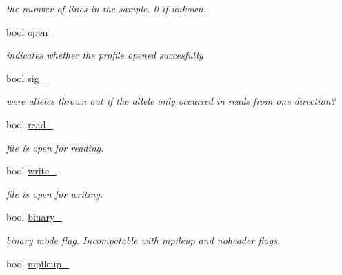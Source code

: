 \begin{DoxyCompactItemize}
\begin{DoxyCompactList}\small\item\em the number of lines in the sample. 0 if unkown. \end{DoxyCompactList}\item 
\hypertarget{classprofile_abf881480daa99f3fa69479b2d63db2c3}{bool \hyperlink{classprofile_abf881480daa99f3fa69479b2d63db2c3}{open\-\_\-}}\label{classprofile_abf881480daa99f3fa69479b2d63db2c3}

\begin{DoxyCompactList}\small\item\em indicates whether the profile opened succesfully \end{DoxyCompactList}\item 
\hypertarget{classprofile_a0ea932076e4991184cccc203c385c494}{bool \hyperlink{classprofile_a0ea932076e4991184cccc203c385c494}{sig\-\_\-}}\label{classprofile_a0ea932076e4991184cccc203c385c494}

\begin{DoxyCompactList}\small\item\em were alleles thrown out if the allele only occurred in reads from one direction? \end{DoxyCompactList}\item 
\hypertarget{classprofile_ab86c9f0e89a08b2441a9790c591f3bc4}{bool \hyperlink{classprofile_ab86c9f0e89a08b2441a9790c591f3bc4}{read\-\_\-}}\label{classprofile_ab86c9f0e89a08b2441a9790c591f3bc4}

\begin{DoxyCompactList}\small\item\em file is open for reading. \end{DoxyCompactList}\item 
\hypertarget{classprofile_affb930acde8d897c2449dc46d2d159f7}{bool \hyperlink{classprofile_affb930acde8d897c2449dc46d2d159f7}{write\-\_\-}}\label{classprofile_affb930acde8d897c2449dc46d2d159f7}

\begin{DoxyCompactList}\small\item\em file is open for writing. \end{DoxyCompactList}\item 
\hypertarget{classprofile_a51ad7b2bd3a81a753da8248fb99e27cd}{bool \hyperlink{classprofile_a51ad7b2bd3a81a753da8248fb99e27cd}{binary\-\_\-}}\label{classprofile_a51ad7b2bd3a81a753da8248fb99e27cd}

\begin{DoxyCompactList}\small\item\em binary mode flag. Incompatable with mpileup and noheader flags. \end{DoxyCompactList}\item 
\hypertarget{classprofile_a74b8fe8ed39eacc152c64fc83c9e5efe}{bool \hyperlink{classprofile_a74b8fe8ed39eacc152c64fc83c9e5efe}{mpileup\-\_\-}}\label{classprofile_a74b8fe8ed39eacc152c64fc83c9e5efe}


\end{DoxyCompactItemize}
